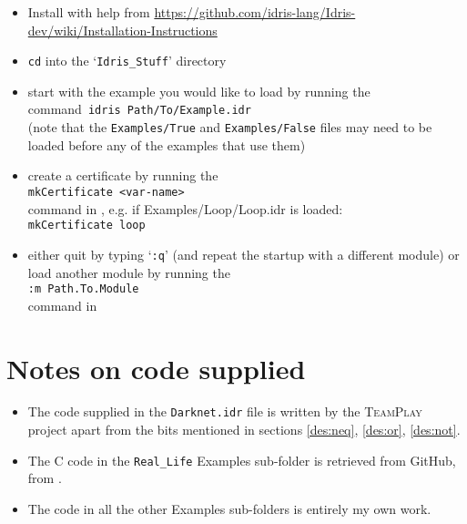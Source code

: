 \begin{itemize}
    \item Install \Idris with help from \url{https://github.com/idris-lang/Idris-dev/wiki/Installation-Instructions}
    \item \texttt{cd} into the `\texttt{Idris\_Stuff}' directory
    \item start \Idris with the example you would like to load by running the command\
          \texttt{idris Path/To/Example.idr}\\
          (note that the \texttt{Examples/True} and \texttt{Examples/False} files may need to be loaded before any of the examples that use them)
    \item create a certificate by running the\\
          \texttt{mkCertificate <var-name>}\\
          command in \Idris, e.g. if Examples/Loop/Loop.idr is loaded:\\
          \texttt{mkCertificate loop}
    \item either quit by typing `\texttt{:q}' (and repeat the \Idris startup with a different module) or load another module by running the\\
          \texttt{:m Path.To.Module}\\
          command in \Idris
\end{itemize}

\section{Notes on code supplied}
    \begin{itemize}
    \item The code supplied in the \texttt{Darknet.idr} file is written by the \textsc{TeamPlay} project apart from the bits mentioned in sections \ref{des:neq}, \ref{des:or}, \ref{des:not}.
    
    \item The C code in the \texttt{Real\_Life} Examples sub-folder is retrieved from GitHub, from \cite{c_aes,beebs}.
    
    \item The code in all the other Examples sub-folders is entirely my own work.
    \end{itemize}
